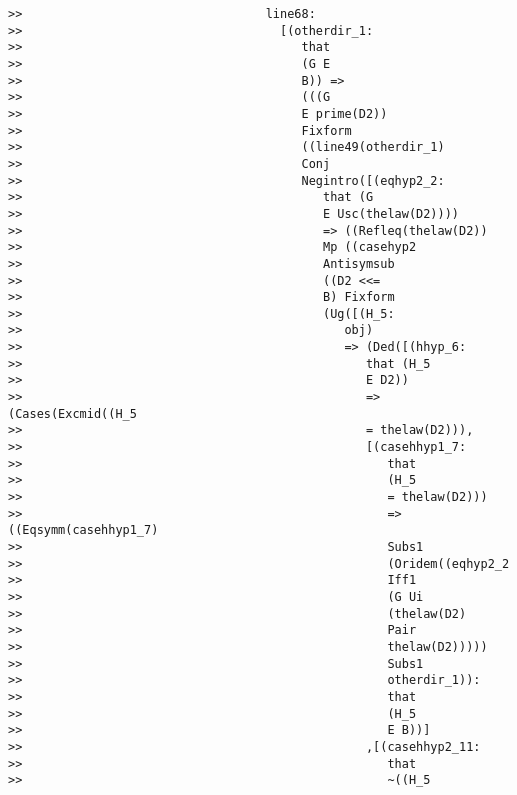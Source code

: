 \documentclass[12pt]{article}
\begin{document}
\begin{verbatim}
>>                                  line68:
>>                                    [(otherdir_1:
>>                                       that
>>                                       (G E
>>                                       B)) =>
>>                                       (((G
>>                                       E prime(D2))
>>                                       Fixform
>>                                       ((line49(otherdir_1)
>>                                       Conj
>>                                       Negintro([(eqhyp2_2:
>>                                          that (G
>>                                          E Usc(thelaw(D2))))
>>                                          => ((Refleq(thelaw(D2))
>>                                          Mp ((casehyp2
>>                                          Antisymsub
>>                                          ((D2 <<=
>>                                          B) Fixform
>>                                          (Ug([(H_5:
>>                                             obj)
>>                                             => (Ded([(hhyp_6:
>>                                                that (H_5
>>                                                E D2))
>>                                                => (Cases(Excmid((H_5
>>                                                = thelaw(D2))),
>>                                                [(casehhyp1_7:
>>                                                   that
>>                                                   (H_5
>>                                                   = thelaw(D2)))
>>                                                   => ((Eqsymm(casehhyp1_7)
>>                                                   Subs1
>>                                                   (Oridem((eqhyp2_2
>>                                                   Iff1
>>                                                   (G Ui
>>                                                   (thelaw(D2)
>>                                                   Pair
>>                                                   thelaw(D2)))))
>>                                                   Subs1
>>                                                   otherdir_1)):
>>                                                   that
>>                                                   (H_5
>>                                                   E B))]
>>                                                ,[(casehhyp2_11:
>>                                                   that
>>                                                   ~((H_5

\end{verbatim}
\end{document}
